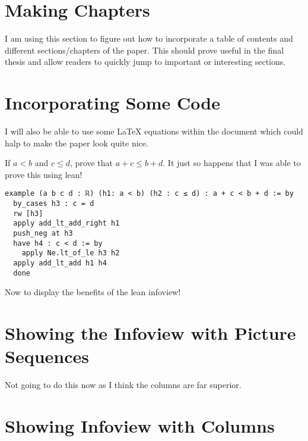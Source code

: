 \documentclass[
  letterpaper,
]{scrreprt}
\theoremstyle{remark}
\begin{document}
\hypertarget{making-chapters}{%
\section*{Making Chapters}\label{making-chapters}}


I am using this section to figure out how to incorporate a table of
contents and different sections/chapters of the paper. This should prove
useful in the final thesis and allow readers to quickly jump to
important or interesting sections.

\hypertarget{incorporating-some-code}{%
\section*{Incorporating Some Code}\label{incorporating-some-code}}


I will also be able to use some LaTeX equations within the document
which could halp to make the paper look quite nice.

If \(a < b\) and \(c \le d\), prove that \(a + c \le b + d\). It just so
happens that I was able to prove this using lean!

\begin{verbatim}
example (a b c d : ℝ) (h1: a < b) (h2 : c ≤ d) : a + c < b + d := by
  by_cases h3 : c = d
  rw [h3]
  apply add_lt_add_right h1
  push_neg at h3
  have h4 : c < d := by
    apply Ne.lt_of_le h3 h2
  apply add_lt_add h1 h4
  done
\end{verbatim}

Now to display the benefits of the lean infoview!

\hypertarget{showing-the-infoview-with-picture-sequences}{%
\section*{Showing the Infoview with Picture
Sequences}\label{showing-the-infoview-with-picture-sequences}}


Not going to do this now as I think the columns are far superior.

\hypertarget{showing-infoview-with-columns}{%
\section*{Showing Infoview with
Columns}\label{showing-infoview-with-columns}}
\end{document}

